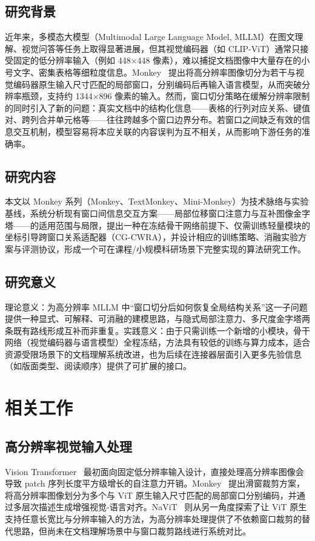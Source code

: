 \documentclass[journal]{IEEEtran}
\begin{document}
\subsection{研究背景}
近年来，多模态大模型（Multimodal Large Language Model, MLLM）在图文理解、视觉问答等任务上取得显著进展，但其视觉编码器（如 CLIP-ViT）通常只接受固定的低分辨率输入（例如 448$\times$448 像素），难以捕捉文档图像中大量存在的小号文字、密集表格等细粒度信息。Monkey~\cite{monkey} 提出将高分辨率图像切分为若干与视觉编码器原生输入尺寸匹配的局部窗口，分别编码后再输入语言模型，从而突破分辨率瓶颈，支持约 1344$\times$896 像素的输入。然而，窗口切分策略在缓解分辨率限制的同时引入了新的问题：真实文档中的结构化信息——表格的行列对应关系、键值对、跨列合并单元格等——往往跨越多个窗口边界分布。若窗口之间缺乏有效的信息交互机制，模型容易将本应关联的内容误判为互不相关，从而影响下游任务的准确率。

\subsection{研究内容}
本文以 Monkey 系列（Monkey、TextMonkey、Mini-Monkey）为技术脉络与实验基线，系统分析现有窗口间信息交互方案——局部位移窗口注意力与互补图像金字塔——的适用范围与局限，提出一种在冻结骨干网络前提下、仅需训练轻量模块的坐标引导跨窗口关系适配器（CG-CWRA），并设计相应的训练策略、消融实验方案与评测协议，形成一个可在课程/小规模科研场景下完整实现的算法研究工作。

\subsection{研究意义}
理论意义：为高分辨率 MLLM 中“窗口切分后如何恢复全局结构关系”这一子问题提供一种显式、可解释、可消融的建模思路，与隐式局部注意力、多尺度金字塔两条既有路线形成互补而非重复。实践意义：由于只需训练一个新增的小模块，骨干网络（视觉编码器与语言模型）全程冻结，方法具有较低的训练与算力成本，适合资源受限场景下的文档理解系统改进，也为后续在连接器层面引入更多先验信息（如版面类型、阅读顺序）提供了可扩展的接口。

\section{相关工作}

\subsection{高分辨率视觉输入处理}
Vision Transformer~\cite{vit} 最初面向固定低分辨率输入设计，直接处理高分辨率图像会导致 patch 序列长度平方级增长的自注意力开销。Monkey~\cite{monkey} 提出滑窗裁剪方案，将高分辨率图像划分为多个与 ViT 原生输入尺寸匹配的局部窗口分别编码，并通过多层次描述生成增强视觉-语言对齐。NaViT~\cite{navit} 则从另一角度探索了让 ViT 原生支持任意长宽比与分辨率输入的方法，为高分辨率处理提供了不依赖窗口裁剪的替代思路，但尚未在文档理解场景中与窗口裁剪路线进行系统对比。
\end{document}
